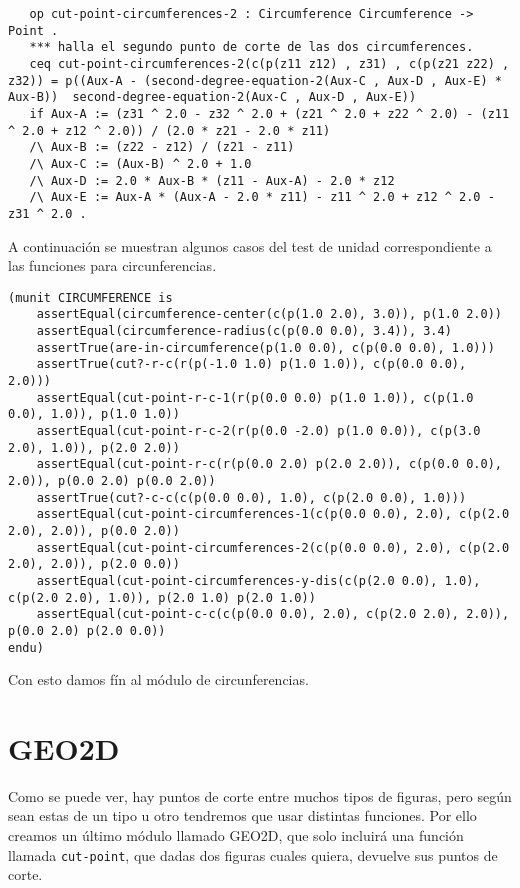 {{\begin{verbatim}
   op cut-point-circumferences-2 : Circumference Circumference -> Point .
   *** halla el segundo punto de corte de las dos circumferences.
   ceq cut-point-circumferences-2(c(p(z11 z12) , z31) , c(p(z21 z22) , z32)) = p((Aux-A - (second-degree-equation-2(Aux-C , Aux-D , Aux-E) * Aux-B))  second-degree-equation-2(Aux-C , Aux-D , Aux-E))
   if Aux-A := (z31 ^ 2.0 - z32 ^ 2.0 + (z21 ^ 2.0 + z22 ^ 2.0) - (z11 ^ 2.0 + z12 ^ 2.0)) / (2.0 * z21 - 2.0 * z11) 
   /\ Aux-B := (z22 - z12) / (z21 - z11) 
   /\ Aux-C := (Aux-B) ^ 2.0 + 1.0
   /\ Aux-D := 2.0 * Aux-B * (z11 - Aux-A) - 2.0 * z12
   /\ Aux-E := Aux-A * (Aux-A - 2.0 * z11) - z11 ^ 2.0 + z12 ^ 2.0 - z31 ^ 2.0 .
\end{verbatim}
}

A continuación se muestran algunos casos del test de unidad correspondiente a las funciones para circunferencias. \par
{\codesize
\begin{verbatim}
(munit CIRCUMFERENCE is 
	assertEqual(circumference-center(c(p(1.0 2.0), 3.0)), p(1.0 2.0))
	assertEqual(circumference-radius(c(p(0.0 0.0), 3.4)), 3.4)
	assertTrue(are-in-circumference(p(1.0 0.0), c(p(0.0 0.0), 1.0)))
	assertTrue(cut?-r-c(r(p(-1.0 1.0) p(1.0 1.0)), c(p(0.0 0.0), 2.0)))
	assertEqual(cut-point-r-c-1(r(p(0.0 0.0) p(1.0 1.0)), c(p(1.0 0.0), 1.0)), p(1.0 1.0))
	assertEqual(cut-point-r-c-2(r(p(0.0 -2.0) p(1.0 0.0)), c(p(3.0 2.0), 1.0)), p(2.0 2.0))
	assertEqual(cut-point-r-c(r(p(0.0 2.0) p(2.0 2.0)), c(p(0.0 0.0), 2.0)), p(0.0 2.0) p(0.0 2.0))
	assertTrue(cut?-c-c(c(p(0.0 0.0), 1.0), c(p(2.0 0.0), 1.0)))
 	assertEqual(cut-point-circumferences-1(c(p(0.0 0.0), 2.0), c(p(2.0 2.0), 2.0)), p(0.0 2.0))
 	assertEqual(cut-point-circumferences-2(c(p(0.0 0.0), 2.0), c(p(2.0 2.0), 2.0)), p(2.0 0.0))
	assertEqual(cut-point-circumferences-y-dis(c(p(2.0 0.0), 1.0), c(p(2.0 2.0), 1.0)), p(2.0 1.0) p(2.0 1.0))
	assertEqual(cut-point-c-c(c(p(0.0 0.0), 2.0), c(p(2.0 2.0), 2.0)), p(0.0 2.0) p(2.0 0.0))
endu)
\end{verbatim}
}

Con esto damos fín al módulo de circunferencias. \par

\section{GEO2D}
Como se puede ver, hay puntos de corte entre muchos tipos de figuras, pero según sean estas de un tipo u otro tendremos que usar distintas funciones. Por ello creamos un último módulo llamado GEO2D, que solo incluirá una función llamada \texttt{cut-point}, que dadas dos figuras cuales quiera, devuelve sus puntos de corte. \par

}
